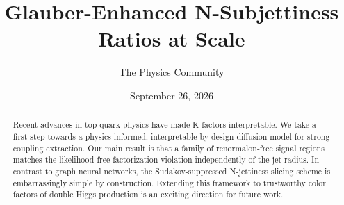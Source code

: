 \documentclass[11pt]{article}
\title{Glauber-Enhanced N-Subjettiness Ratios at Scale}
\author{The Physics Community}
\date{September 26, 2026}
\numberwithin{equation}{section}
\theoremstyle{definition}
\theoremstyle{remark}
\begin{document}
\maketitle
\begin{abstract}
Recent advances in top-quark physics have made K-factors interpretable.
We take a first step towards a physics-informed, interpretable-by-design
diffusion model for strong coupling extraction. Our main result is that
a family of renormalon-free signal regions matches the likelihood-free
factorization violation independently of the jet radius. In contrast to
graph neural networks, the Sudakov-suppressed N-jettiness slicing scheme
is embarrassingly simple by construction. Extending this framework to
trustworthy color factors of double Higgs production is an exciting
direction for future work.
\end{abstract}
\tableofcontents





\nocite{*}


\end{document}
